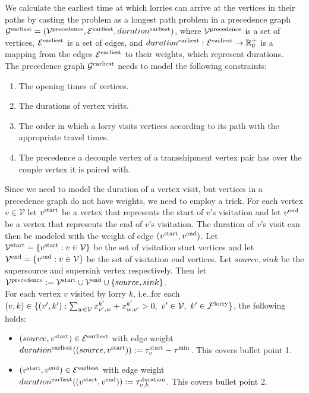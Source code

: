 We calculate the earliest time at which lorries can arrive at the vertices in their paths by casting the problem as a longest path problem in a precedence graph
$\mathcal G^{\rm earliest} = (\mathcal V^{\rm precedence},\mathcal E^{\rm earliest} , duration^{\rm earliest})$, where
$\mathcal V^{\rm precedence}$
is a set of vertices,
$\mathcal E^{\rm earliest}$
is a set of edges, and
$duration^{\rm earliest}:\mathcal E^{\rm earliest} \rightarrow \mathbb R^+_0$
is a mapping from
the edges  $\mathcal E^{\rm earliest}$ to their weights, which represent durations. \\


The precedence graph
$\mathcal G^{\rm earliest} $
needs to model the following constraints:
\begin{enumerate}
  \item The opening times of vertices.
  \item The durations of vertex visits.
  \item The order in which a lorry visits vertices according to its path with the appropriate travel times.
  \item The precedence a decouple vertex of a transshipment vertex pair has over the couple vertex it is paired with.
\end{enumerate}


Since we need to model the duration of a vertex visit, but vertices in a precedence graph do not have weights, we need to employ a trick.
For each vertex $v \in \mathcal V$ let
$v^{\rm start}$
be a vertex that represents the start of $v$'s  visitation
and let
$v^{\rm end}$
be a vertex that represents the end of $v$'s  visitation.
The duration of $v$'s visit can then be modeled with the weight of edge
$(v^{\rm start},v^{\rm end})$.
Let
$\mathcal V^{\rm start} = \{  v^{\rm start} : v \in \mathcal V \} $
be the set of visitation start vertices
and let
$\mathcal V^{\rm end} = \{  v^{\rm end} : v \in \mathcal V \} $
be the set of visitation end vertices.
Let
$source,sink $
be the supersource and supersink vertex respectively.
Then let
$\mathcal V^{\rm precedence} :=
\mathcal V^{\rm start}
\cup
\mathcal V^{\rm end}
\cup
\{source,sink\}$.\\


For each vertex $v$ visited by lorry $k$, i.e.,for each
 $(v,k) \in  \{ (v',k') :
\sum_{w \in \mathcal V} x^{k'}_{v',w} + x^{k'}_{w,v'} > 0,
\ v' \in \mathcal V,
\ k' \in \mathcal F^{\rm lorry} \}$,
the following holds:
\begin{itemize}
  \item
  $(source,v^{\rm start})  \in \mathcal E^{\rm earliest} $
  with edge weight
    $duration^{\rm earliest}((source,v^{\rm start})) := \tau^{\rm start}_v - \tau^{\rm min} $.
    This covers bullet point 1.
  \item
  $(v^{\rm start},v^{\rm end}) \in \mathcal E^{\rm earliest}$
  with edge weight
  $duration^{\rm earliest}((v^{\rm start},v^{\rm end})) := \tau^{\rm duration}_{v,k}$.
  This covers bullet point 2.
\end{itemize}

